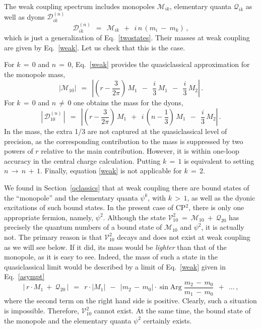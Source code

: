 \documentclass[epsfig,12pt]{article}
\def\beq{\begin{equation}}
\def\eeq{\end{equation}}
\def\beq{\begin{equation}}
\def\eeq{\end{equation}}
\newcommand{\M}{\mathcal{M}}
\newcommand{\Q}{\mathcal{Q}}
\newcommand{\D}{\mathcal{D}}
\newcommand{\V}{\mathcal{V}}
\begin{document}
	The weak coupling spectrum includes monopoles $ \M_{ik} $, elementary quanta $ \Q_{ik} $ 
	as well as dyons $ \D^{(n)}_{ik} $
\beq
	\D^{(n)}_{ik} ~~=~~ \M_{ik} ~~+~~ i\, n\, ( m_i ~-~ m_k ) \,,
\eeq
	which is just a generalization of Eq.~\eqref{twostates}.
	Their masses at weak coupling are given by Eq.~\eqref{weak}.
	Let us check that  this is the case.
	
	For $ k \,=\, 0 $ and $ n \,=\, 0 $, Eq.~\eqref{weak} provides the quasiclassical approximation for the monopole mass,
\beq
	| \M_{10} |  ~~=~~  \left|\left(r -\frac{3}{2\pi} \right)\, M_1 
	~~-~~ \frac{i}{3}\,  M_1 ~~-~~ \frac{i}{3}\,  M_2 \right|\,.
\eeq
	For $ k \,=\, 0 $ and $ n \,\neq\, 0 $ one obtains the mass for the dyons,
\beq
	\left|\, \D_{10}^{(n)} \,\right|  ~~=~~  \left|\left(r -\frac{3}{2\pi} \right)\, M_1  ~~+~~  i\, (n-\frac13)  \, M_1
	~~-~~ \frac{i}{3}\,  M_2  \right| \,.
\eeq
	In the mass, the extra 1/3 are not captured at the quasiclassical level of precision, as the corresponding
	contribution to the mass
	is suppressed by two powers of $ r $ relative to the main contribution. 
	However, it is within one-loop accuracy in the central charge calculation.
	Putting $ k \,=\, 1 $ is equivalent to setting $ n \,\to\, n \,+\, 1 $.
	Finally, equation \eqref{weak} is not applicable for $ k \,=\, 2 $.

	We found in Section~\ref{qclassics} that at weak coupling there are
	bound states of the ``monopole'' and the elementary quanta $ \psi^k $, with $ k \,>\, 1 $,
	as well as the dyonic excitations of such bound states.
	In the present case of CP$^2$, there is only one appropriate fermion, namely, $ \psi^2 $. 
	Although the state $ \V_{10}^2 ~=~ \M_{10} ~+~ \Q_{20} $ has precisely the quantum numbers
	of a bound state of $ \M_{10} $ and $ \psi^2 $, it is actually not.
	The primary reason is that $ \V_{10}^2 $ decays and does not exist at weak coupling as we will see below.
	If it did, its mass would be \emph{lighter} than that of the monopole, as it is easy to see.
	Indeed, the mass of such a state in the quasiclassical limit would be described by a limit of Eq.~\eqref{weak}
	given in Eq.~\eqref{asympt}
\beq
       |\, r \cdot M_1  ~+~ \Q_{20} \,|  ~~=~~ r \cdot | M_1 |  ~~-~~ | m_2 \,-\, m_0 | \cdot \sin \text{Arg}\; \frac { m_2 \,-\, m_0 } 
                                                                                                                      { m_1 \,-\, m_0 }  
                                                                ~~+~~ ... \,,
\eeq
	where the second term on the right hand side is positive. Clearly, such a situation is impossible.
	Therefore, $ \V_{10}^2 $ cannot exist. At the same time, the bound state of the
	monopole and the elementary quanta $ \psi^2$ certainly exists.
\end{document}
